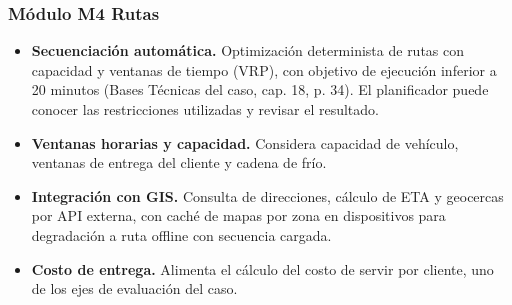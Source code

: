 \subsubsection*{Módulo M4 Rutas}
\begin{itemize}
  \item \textbf{Secuenciación automática.} Optimización determinista de rutas con capacidad y ventanas de tiempo (VRP), con objetivo de ejecución inferior a 20 minutos (Bases Técnicas del caso, cap. 18, p. 34). El planificador puede conocer las restricciones utilizadas y revisar el resultado.
  \item \textbf{Ventanas horarias y capacidad.} Considera capacidad de vehículo, ventanas de entrega del cliente y cadena de frío.
  \item \textbf{Integración con GIS.} Consulta de direcciones, cálculo de ETA y geocercas por API externa, con caché de mapas por zona en dispositivos para degradación a ruta offline con secuencia cargada.
  \item \textbf{Costo de entrega.} Alimenta el cálculo del costo de servir por cliente, uno de los ejes de evaluación del caso.
\end{itemize}

